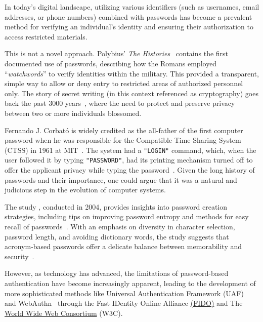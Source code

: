 In today's digital landscape, utilizing various identifiers (such as usernames, email addresses, or phone numbers)
combined with passwords has become a prevalent method for verifying an individual's identity and ensuring
their authorization to access restricted materials.

This is not a novel approach.
Polybius' \textit{The Histories}~\cite{perseus_tufts} contains the first documented use
of passwords, describing
how
the Romans employed ``\textit{watchwords}'' to verify identities within the military.
This provided a transparent, simple way to allow or deny entry to restricted areas of authorized personnel only.
The story of secret writing (in this context referenced as cryptography) goes
back the past 3000 years~\cite{history_cryptography_cryptanalysis}, where the
need to protect and preserve privacy between two or more individuals blossomed.

Fernando J. Corbató is widely credited as the all-father of the first
computer password when he was responsible for the Compatible Time-Sharing
System (CTSS) in 1961 at MIT~\cite{levy1984hackers}.
The system had a \texttt{"LOGIN"} command, which, when the user followed it by
typing \texttt{"PASSWORD"}, had its printing mechanism turned off to offer
the applicant privacy while typing the password~\cite{ctss_programmers_guide}.
Given the long history of passwords and their importance, one could argue that
it was a natural and judicious step in the evolution of computer systems.

The study , conducted in
2004, provides insights into password creation strategies, including tips on
improving password entropy and methods for easy recall of passwords~\cite{
    yan2000password}.
With an emphasis on diversity in character selection, password length, and
avoiding dictionary words, the study suggests that acronym-based passwords offer
a delicate balance between memorability and security~\cite{yan2000password}.

However, as technology has advanced, the limitations of password-based
authentication have become increasingly apparent, leading to the development of
more sophisticated methods like Universal Authentication Framework
(UAF)~\cite{fido_uaf_overview} and WebAuthn~\cite{webauthn_level_2} through the
Fast IDentity Online Alliance \href{https://fidoalliance.org}{(FIDO)} and
The \href{https://www.w3.org}{World Wide Web Consortium} (W3C).

\newcommand{\assymetricCrypto}{\footnote{Asymmetric cryptography uses a key pair consisting of public and private keys. The public key encrypts
data, while the private key decrypts it. The keys are mathematically related, but deriving one from the other
is infeasible, ensuring secure communication and data exchange.}}
\newcommand{\jsonwebLibrary}{\footnote{
    \textbf{Note:} According to the library used to implement
    \href{https://docs.rs/jsonwebtoken/latest/jsonwebtoken/index.html}{jsonwebtokens in Rust}
    it is the private key that encrypts and the public key is responsible for \href{https://docs.rs/jsonwebtoken/latest/jsonwebtoken/struct.DecodingKey.html#method.from_rsa_pem}
    {decrypting}. \textit{Last Accessed: 2023-03-25}.}}

